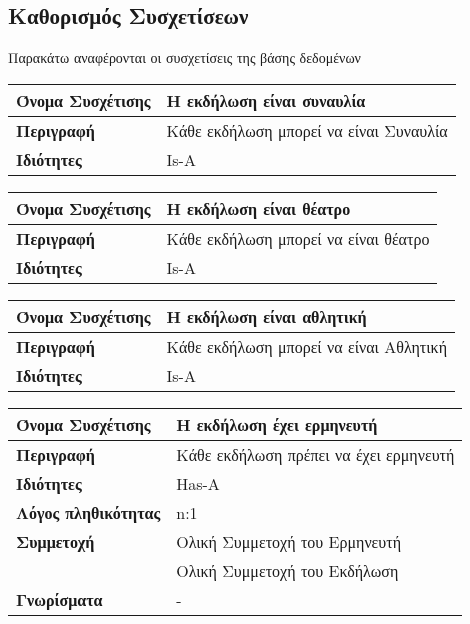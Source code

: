 \subsection{Καθορισμός Συσχετίσεων}

Παρακάτω αναφέρονται οι συσχετίσεις της βάσης δεδομένων \titlos
\begin{center}
\begin{tabular}[]{|p{4cm}|p{10cm}|}
  \hline
  \textbf{Όνομα Συσχέτισης} & Η εκδήλωση είναι συναυλία\\ \hline
  \textbf{Περιγραφή} & Κάθε εκδήλωση μπορεί να είναι Συναυλία\\ \hline
  \textbf{Ιδιότητες} & Is-A  \\ \hline
\end{tabular}
\vspace{0.3 cm}

\begin{tabular}[]{|p{4cm}|p{10cm}|}
  \hline
  \textbf{Όνομα Συσχέτισης} & Η εκδήλωση είναι θέατρο\\ \hline
  \textbf{Περιγραφή} & Κάθε εκδήλωση μπορεί να είναι θέατρο\\ \hline
  \textbf{Ιδιότητες} & Is-A  \\ \hline
\end{tabular}
\vspace{0.3 cm}

\begin{tabular}[]{|p{4cm}|p{10cm}|}
  \hline
  \textbf{Όνομα Συσχέτισης} & Η εκδήλωση είναι αθλητική\\ \hline
  \textbf{Περιγραφή} & Κάθε εκδήλωση μπορεί να είναι Αθλητική\\ \hline
  \textbf{Ιδιότητες} & Is-A  \\ \hline
  \end{tabular}
\vspace{0.3 cm}

\begin{tabular}[]{|p{4cm}|p{10cm}|}
  \hline
  \textbf{Όνομα Συσχέτισης} & Η εκδήλωση έχει ερμηνευτή\\ \hline
  \textbf{Περιγραφή} & Κάθε εκδήλωση πρέπει να έχει ερμηνευτή\\ \hline
  \textbf{Ιδιότητες} & Has-A  \\ \hline
  \textbf{Λόγος πληθικότητας} & n:1 \\ \hline
  \textbf{Συμμετοχή} & Ολική Συμμετοχή του Ερμηνευτή\\ \cline{2-2}
                     & Ολική Συμμετοχή του Εκδήλωση \\ \hline
  \textbf{Γνωρίσματα} & - \\ \hline
\end{tabular}
\vspace{0.3 cm}


\end{center}
